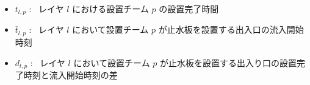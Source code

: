 \documentclass[a4paper,12pt,fleqn]{jarticle}
\begin{document}
\begin{itemize}
\begin{itemize}
  \item $t_{l,p}$ : \ レイヤ $l$ における設置チーム $p$ の設置完了時間
  \item $\bar{t}_{l,p}$ : \ レイヤ $l$ において設置チーム $p$ が止水板を設置する出入口の流入開始時刻
  \item $d_{l,p}$ : \ レイヤ $l$ において設置チーム $p$ が止水板を設置する出入り口の設置完了時刻と流入開始時刻の差
  \end{itemize}
\end{itemize}


      

    
\end{document}

